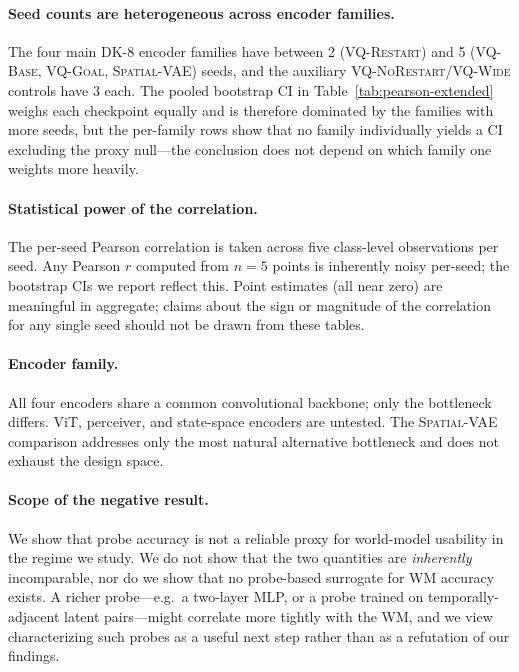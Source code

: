 \documentclass{article}
\newcommand{\encVQBase}{\textsc{VQ-Base}}
\newcommand{\encVQNoRestart}{\textsc{VQ-NoRestart}}
\newcommand{\encVQRestart}{\textsc{VQ-Restart}}
\newcommand{\encVQGoal}{\textsc{VQ-Goal}}
\newcommand{\encVQWide}{\textsc{VQ-Wide}}
\newcommand{\encSpatialVAE}{\textsc{Spatial-VAE}}
\begin{document}
\paragraph{Seed counts are heterogeneous across encoder families.}
The four main DK-8 encoder families have between 2 (\encVQRestart{}) and 5 (\encVQBase{}, \encVQGoal{}, \encSpatialVAE{}) seeds, and the auxiliary \encVQNoRestart{}/\encVQWide{} controls have 3 each. The pooled bootstrap CI in Table~\ref{tab:pearson-extended} weighs each checkpoint equally and is therefore dominated by the families with more seeds, but the per-family rows show that no family individually yields a CI excluding the proxy null---the conclusion does not depend on which family one weights more heavily.

\paragraph{Statistical power of the correlation.}
The per-seed Pearson correlation is taken across five class-level observations per seed. Any Pearson $r$ computed from $n{=}5$ points is inherently noisy per-seed; the bootstrap CIs we report reflect this. Point estimates (all near zero) are meaningful in aggregate; claims about the sign or magnitude of the correlation for any single seed should not be drawn from these tables.

\paragraph{Encoder family.}
All four encoders share a common convolutional backbone; only the bottleneck differs. ViT, perceiver, and state-space encoders are untested. The \encSpatialVAE{} comparison addresses only the most natural alternative bottleneck and does not exhaust the design space.

\paragraph{Scope of the negative result.}
We show that probe accuracy is not a reliable proxy for world-model usability in the regime we study. We do not show that the two quantities are \emph{inherently} incomparable, nor do we show that no probe-based surrogate for WM accuracy exists. A richer probe---e.g.\ a two-layer MLP, or a probe trained on temporally-adjacent latent pairs---might correlate more tightly with the WM, and we view characterizing such probes as a useful next step rather than as a refutation of our findings.
\end{document}
